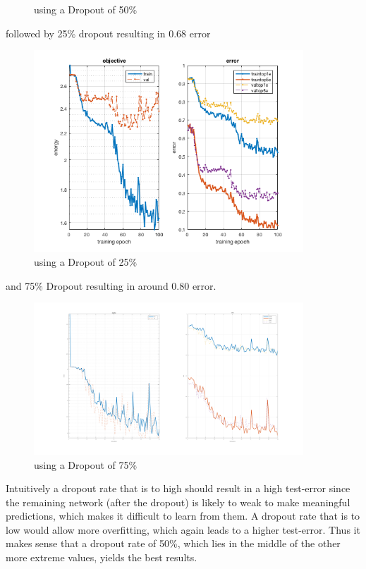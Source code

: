 \documentclass[12pt]{article}
\begin{document}
\begin{enumerate}[a)]
\begin{figure}[H]
                \caption{using a Dropout of 50\%}
        \end{figure}
        followed by 25\% dropout resulting in 0.68 error 
        \begin{figure}[H]
            \centering
                \includegraphics[width=0.9\textwidth]{Plots/3_25_200.png}
                \caption{using a Dropout of 25\%}
        \end{figure}
        and 75\% Dropout resulting in around 0.80 error.
        \begin{figure}[H]
            \centering
                \includegraphics[width=0.9\textwidth]{Plots/3_75_100.png}
                \caption{using a Dropout of 75\%}
        \end{figure}
        Intuitively a dropout rate that is to high should result in a high test-error since the remaining network (after the dropout) is likely to weak to make meaningful predictions, which makes it difficult to learn from them. A dropout rate that is to low would allow more overfitting, which again leads to a higher test-error. Thus it makes sense that a dropout rate of 50\%, which lies in the middle of the other more extreme values, yields the best results.
\end{enumerate}
\end{document}
